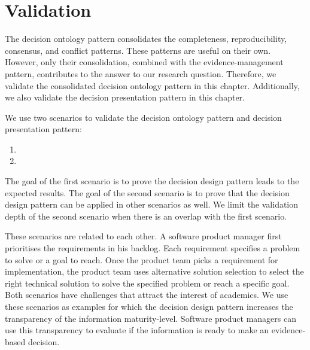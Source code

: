 \section{Validation} \label{validation}
The decision ontology pattern consolidates the completeness, reproducibility, consensus, and conflict patterns. These patterns are useful on their own. However, only their consolidation, combined with the evidence-management pattern, contributes to the answer to our research question. Therefore, we validate the consolidated decision ontology pattern in this chapter. Additionally, we also validate the decision presentation pattern in this chapter. 

We use two scenarios to validate the decision ontology pattern and decision presentation pattern:
\begin{enumerate}
\item {}
\item {}
\end{enumerate}

The goal of the first scenario is to prove the decision design pattern leads to the expected results. The goal of the second scenario is to prove that the decision design pattern can be applied in other scenarios as well. We limit the validation depth of the second scenario when there is an overlap with the first scenario. 

These scenarios are related to each other. A software product manager first prioritises the requirements in his backlog. Each requirement specifies a problem to solve or a goal to reach. Once the product team picks a requirement for implementation, the product team uses alternative solution selection to select the right technical solution to solve the specified problem or reach a specific goal. Both scenarios have challenges that attract the interest of academics. We use these scenarios as examples for which the decision design pattern increases the transparency of the information maturity-level. Software product managers can use this transparency to evaluate if the information is ready to make an evidence-based decision.

